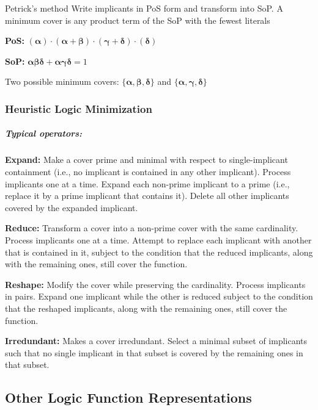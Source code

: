 \documentclass[a4paper]{article}
\begin{document}
\begin{mainbox}{Petrick's method}
Write implicants in PoS form and transform into SoP. A minimum cover is any product term of the SoP with the fewest literals

\textbf{PoS:} $(\mathbf{\alpha}) \cdot (\mathbf{\alpha} + \mathbf{\beta}) \cdot (\mathbf{\gamma} + \mathbf{\delta}) \cdot (\mathbf{\delta})$

\textbf{SoP:} $\mathbf{\alpha} \mathbf{\beta} \mathbf{\delta} + \mathbf{\alpha} \mathbf{\gamma} \mathbf{\delta} = 1$

Two possible minimum covers: $\{\mathbf{\alpha}, \mathbf{\beta}, \mathbf{\delta}\}$ and $\{\mathbf{\alpha}, \mathbf{\gamma}, \mathbf{\delta}\}$
\end{mainbox}

\subsubsection{Heuristic Logic Minimization}

\subparagraph{Typical operators:}
\begin{itemize*}
    \item \textbf{Expand:} Make a cover prime and minimal with respect to single-implicant containment (i.e., no implicant is contained in any other implicant). Process implicants one at a time. Expand each non-prime implicant to a prime (i.e., replace it by a prime implicant that contains it). Delete all other implicants covered by the expanded implicant.
    \item \textbf{Reduce:} Transform a cover into a non-prime cover with the same cardinality. Process implicants one at a time. Attempt to replace each implicant with another that is contained in it, subject to the condition that the reduced implicants, along with the remaining ones, still cover the function.
    \item \textbf{Reshape:} Modify the cover while preserving the cardinality. Process implicants in pairs. Expand one implicant while the other is reduced subject to the condition that the reshaped implicants, along with the remaining ones, still cover the function.
    \item \textbf{Irredundant:} Makes a cover irredundant. Select a minimal subset of implicants such that no single implicant in that subset is covered by the remaining ones in that subset.
\end{itemize*}

\subsection{Other Logic Function Representations}
\end{document}
